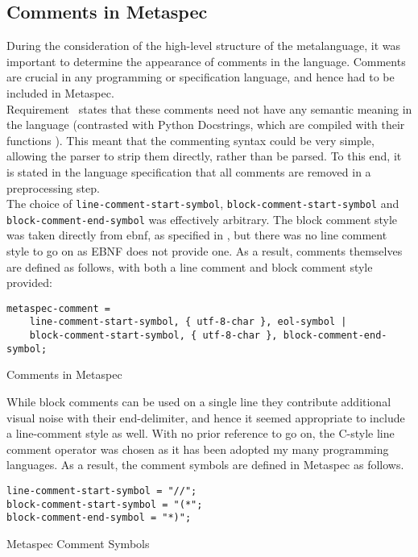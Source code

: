 
\subsection{Comments in Metaspec} %
\label{sub:comments_in_metaspec}
During the consideration of the high-level structure of the metalanguage, it was important to determine the appearance of comments in the language.
Comments are crucial in any programming or specification language, and hence had to be included in Metaspec. \\

Requirement~ states that these comments need not have any semantic meaning in the language (contrasted with Python Docstrings, which are compiled with their functions \citep{python_docstrings}).
This meant that the commenting syntax could be very simple, allowing the parser to strip them directly, rather than be parsed.
To this end, it is stated in the language specification that all comments are removed in a preprocessing step. \\

The choice of \texttt{line-comment-start-symbol}, \texttt{block-comment-start-symbol} and \texttt{block-comment-end-symbol} was effectively arbitrary.
The block comment style was taken directly from \gls{ebnf}, as specified in \cite{standard1996ebnf}, but there was no line comment style to go on as EBNF does not provide one. 
As a result, comments themselves are defined as follows, with both a line comment and block comment style provided:
\begin{listing}[!htb]
\begin{verbatim}
metaspec-comment =
    line-comment-start-symbol, { utf-8-char }, eol-symbol |
    block-comment-start-symbol, { utf-8-char }, block-comment-end-symbol;
\end{verbatim}
\caption{Comments in Metaspec}
\label{lst:comments_in_metaspec}
\end{listing}

While block comments can be used on a single line they contribute additional visual noise with their end-delimiter, and hence it seemed appropriate to include a line-comment style as well.
With no prior reference to go on, the C-style line comment operator was chosen as it has been adopted my many programming languages.
As a result, the comment symbols are defined in Metaspec as follows.
\begin{listing}[!htb]
\begin{verbatim}
line-comment-start-symbol = "//";
block-comment-start-symbol = "(*";
block-comment-end-symbol = "*)";
\end{verbatim}
\caption{Metaspec Comment Symbols}
\label{lst:metaspec_comment_symbols}
\end{listing}

